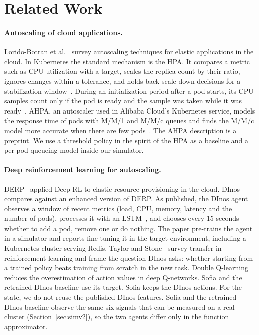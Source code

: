 \section{Related Work}\label{sec:related}

\paragraph{Autoscaling of cloud applications.}
Lorido-Botran et al.~\cite{lorido2014review} survey autoscaling techniques for elastic applications in the
cloud. In Kubernetes the standard mechanism is the HPA. It compares a metric such as CPU utilization with a
target, scales the replica count by their ratio, ignores changes within a tolerance, and holds back scale-down
decisions for a stabilization window~\cite{k8sdocs_hpa}. During an initialization period after a pod starts, its CPU samples count only if the pod is ready and the
sample was taken while it was ready~\cite{k8sdocs_hpa}. AHPA, an autoscaler used in Alibaba Cloud's Kubernetes service, models the response
time of pods with M/M/1 and M/M/c queues and finds the M/M/c model more accurate when there are few
pods~\cite{zhou2023ahpa}. The AHPA description is a preprint. We use a threshold policy in the spirit of the HPA
as a baseline and a per-pod queueing model inside our simulator.

\paragraph{Deep reinforcement learning for autoscaling.}
DERP~\cite{bitsakos2018derp} applied Deep RL to elastic resource provisioning in the cloud.
DInos~\cite{bitsakos2025dinos} compares against an enhanced version of DERP. As published, the DInos agent
observes a window of recent metrics (load, CPU, memory, latency and the number of pods), processes it with an
LSTM~\cite{hochreiter1997lstm}, and chooses every 15 seconds whether to add a pod, remove one or do nothing. The
paper pre-trains the agent in a simulator and reports fine-tuning it in the target environment, including a
Kubernetes cluster serving Redis. Taylor and Stone~\cite{taylor2009transfer} survey
transfer in reinforcement learning and frame the question DInos asks: whether starting from a trained policy
beats training from scratch in the new task. Double Q-learning~\cite{vanhasselt2016ddqn} reduces the
overestimation of action values in deep Q-networks. Sofia and the retrained DInos baseline use its target. Sofia keeps the DInos actions. For the state, we do not reuse the published DInos features. Sofia and the retrained DInos baseline observe the
same six signals that can be measured on a real cluster (Section~\ref{sec:simv2}), so the two agents differ
only in the function approximator.

